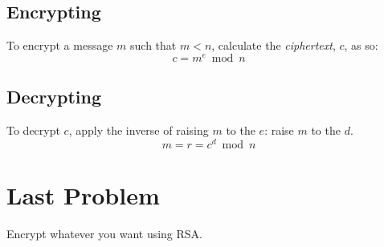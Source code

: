 		\subsection*{Encrypting}
			To encrypt a message $m$ such that $m < n$, calculate the \emph{ciphertext}, $c$, as so:
			\[c = m^e \bmod n\]
		\subsection*{Decrypting}
			To decrypt $c$, apply the inverse of raising $m$ to the $e$: raise $m$ to the $d$.
			\[m = r = c^d \bmod n\]
	\section*{Last Problem}
		Encrypt whatever you want using RSA.

